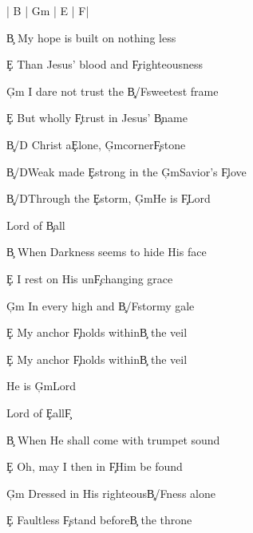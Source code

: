 \documentclass[9pt]{extarticle}
\begin{document}
\bsong

\bi
| B | G\s m | E | F\s  |
\ei

\bv
\c{B} My hope is built on nothing less

\c{E} Than Jesus' blood and \c{F\s }righteousness

\c{G\s m} I dare not trust the \c{B/F\s }sweetest frame

\c{E} But wholly \c{F\s }trust in Jesus' \c{B}name
\ev

\bc
\c{B/D\s } Christ a\c{E}lone, \c{G\s m}corner\c{F\s }stone

\c{B/D\s }Weak made \c{E}strong in the \c{G\s m}Savior's \c{F\s }love

\c{B/D\s }Through the \c{E}storm, \c{G\s m}He is \c{F\s }Lord

Lord of \c{B}all
\ec

\bv
\c{B} When Darkness seems to hide His face

\c{E} I rest on His un\c{F\s }changing grace

\c{G\s m} In every high and \c{B/F\s }stormy gale

\c{E} My anchor \c{F\s }holds within\c{B} the veil

\c{E} My anchor \c{F\s }holds within\c{B} the veil
\ev


\bt
He is \c{G\s m}Lord

Lord of \c{E}all\c{F\s }
\et


\bv
\c{B} When He shall come with trumpet sound

\c{E} Oh, may I then in \c{F\s }Him be found

\c{G\s m} Dressed in His righteous\c{B/F\s }ness alone

\c{E} Faultless \c{F\s }stand before\c{B} the throne
\ev


\esong
\end{document}
